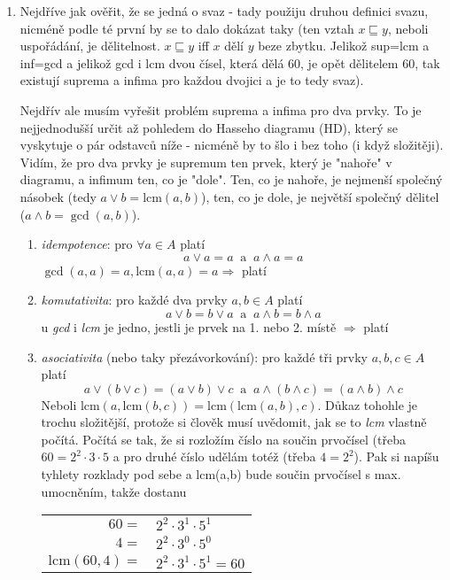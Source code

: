 \documentclass{article}
\begin{document}
\begin{enumerate}
\item Nejdříve jak ověřit, že se jedná o svaz - tady použiju druhou definici svazu, nicméně podle té první by se to dalo dokázat taky (ten vztah $x \sqsubseteq y$, neboli uspořádání, je dělitelnost. $x \sqsubseteq y$ iff $x$ dělí $y$ beze zbytku. Jelikož sup=lcm a inf=gcd a jelikož gcd i lcm dvou čísel, která dělá 60, je opět dělitelem 60, tak existují suprema a infima pro každou dvojici a je to tedy svaz). 

Nejdřív ale musím vyřešit problém suprema a infima pro dva prvky. To je nejjednodušší určit až pohledem do Hasseho diagramu (HD), který se vyskytuje o pár odstavců níže - nicméně by to šlo i bez toho (i když složitěji). Vidím, že pro dva prvky je supremum ten prvek, který je "nahoře" v diagramu, a infimum ten, co je "dole". Ten, co je nahoře, je nejmenší společný násobek (tedy $a \vee b = \mbox{lcm}(a,b)$), ten, co je dole, je největší společný dělitel ($a \wedge b = \gcd(a,b)$). 

\begin{enumerate}
\item \emph{idempotence}: pro $\forall a \in A$ platí
 \[ a \vee a = a \ \mbox{ a }\  a \wedge a = a \]
 $\gcd(a,a) = a, \mbox{lcm}(a,a) = a \Rightarrow$ platí 
\item \emph{komutativita}: pro každé dva prvky $a,b \in A$ platí
 \[ a \vee b = b \vee a \ \mbox{ a }\  a \wedge b = b \wedge a \]
 u \emph{gcd} i \emph{lcm} je jedno, jestli je prvek na 1. nebo 2. místě $\Rightarrow$ platí 
\item \emph{asociativita} (nebo taky přezávorkování): pro každé tři prvky $a,b,c \in A$ platí
 \[ a \vee (b \vee c) = (a \vee b) \vee c \ \mbox{ a }\  a \wedge (b \wedge c) = (a \wedge b) \wedge c \]
Neboli $\mbox{lcm}(a,\mbox{lcm}(b,c)) = \mbox{lcm}(\mbox{lcm}(a,b),c)$. Důkaz tohohle je trochu složitější, protože si člověk musí uvědomit, jak se to \emph{lcm} vlastně počítá. Počítá se tak, že si rozložím číslo na součin prvočísel (třeba $60 = 2^2\cdot3\cdot5$ a pro druhé číslo udělám totéž (třeba $4 = 2^2$). Pak si napíšu tyhlety rozklady pod sebe a lcm(a,b) bude součin prvočísel s max. umocněním, takže dostanu
\begin{center}  %
  \begin{tabular}{r|l}
		$60=$& $2^2\cdot3^1\cdot5^1$ \\ 
		$4=$ & $2^2\cdot3^0\cdot5^0$ \\
		$\mbox{lcm}(60,4) =$ & $2^2\cdot3^1\cdot5^1 = 60$
	\end{tabular}
\end{center} 


\end{enumerate}
\end{enumerate}
\end{document}
